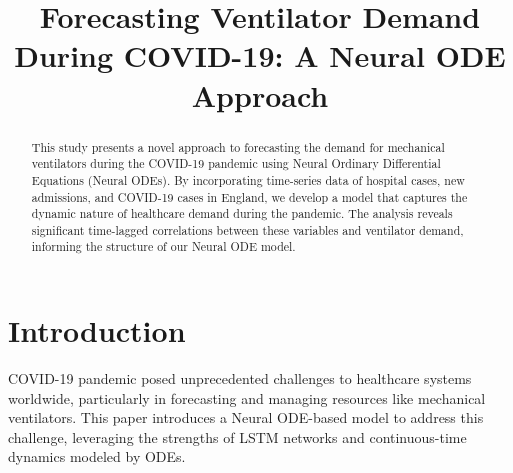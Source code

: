 \documentclass[lettersize, journal]{IEEEtran}
\begin{document}
\title{Forecasting Ventilator Demand During COVID-19: A Neural ODE Approach}

\author{
}
\maketitle

\begin{abstract}
This study presents a novel approach to forecasting the demand for mechanical ventilators during the COVID-19 pandemic using Neural Ordinary Differential Equations (Neural ODEs). By incorporating time-series data of hospital cases, new admissions, and COVID-19 cases in England, we develop a model that captures the dynamic nature of healthcare demand during the pandemic. The analysis reveals significant time-lagged correlations between these variables and ventilator demand, informing the structure of our Neural ODE model.
\end{abstract}

\section{Introduction}
 COVID-19 pandemic posed unprecedented challenges to healthcare systems worldwide, particularly in forecasting and managing resources like mechanical ventilators. This paper introduces a Neural ODE-based model to address this challenge, leveraging the strengths of LSTM networks and continuous-time dynamics modeled by ODEs.
\end{document}
